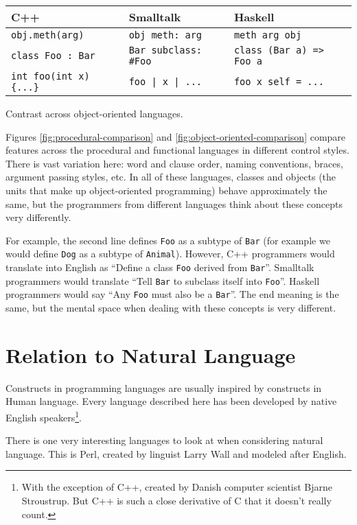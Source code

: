 \documentclass[12pt]{article}
\begin{document}
\begin{Figure}
\label{fig:object-oriented-comparison}
\begin{tabular}{l|l|l}
\textbf{C++} & \textbf{Smalltalk} & \textbf{Haskell} \\
\hline
\verb+obj.meth(arg)+ & \verb+obj meth: arg+ & \verb+meth arg obj+ \\
\verb+class Foo : Bar+ & \verb+Bar subclass: #Foo+ & \verb+class (Bar a) => Foo a+ \\
\verb+int foo(int x) {...}+ & \verb+foo | x | ...+ & \verb+foo x self = ...+ \\
\end{tabular}
\caption{Contrast across object-oriented languages.}
\end{Figure}

Figures \ref{fig:procedural-comparison} and
\ref{fig:object-oriented-comparison} compare features across the
procedural and functional languages in different control styles.  There
is vast variation here: word and clause order, naming conventions,
braces, argument passing styles, etc.  In all of these languages,
classes and objects (the units that make up object-oriented programming)
behave approximately the same, but the programmers from different
languages think about these concepts very differently.  

For example, the second line defines \texttt{Foo} as a subtype of
\texttt{Bar} (for example we would define \texttt{Dog} as a subtype of
\texttt{Animal}).  However, C++ programmers would translate into English
as ``Define a class \texttt{Foo} derived from \texttt{Bar}''.  Smalltalk
programmers would translate ``Tell \texttt{Bar} to subclass itself into
\texttt{Foo}''.  Haskell programmers would say ``Any \texttt{Foo} must
also be a \texttt{Bar}''.  The end meaning is the same, but the mental
space when dealing with these concepts is very different.  

\section{Relation to Natural Language}

Constructs in programming languages are usually inspired by constructs
in Human language.  Every language described here has been developed by
native English speakers\footnote{With the exception of C++, created by
Danish computer scientist Bjarne Stroustrup.  But C++ is such a close
derivative of C that it doesn't really count.}.

There is one very interesting languages to look at when considering
natural language.  This is Perl, created by linguist Larry Wall and
modeled after English.
\end{document}

